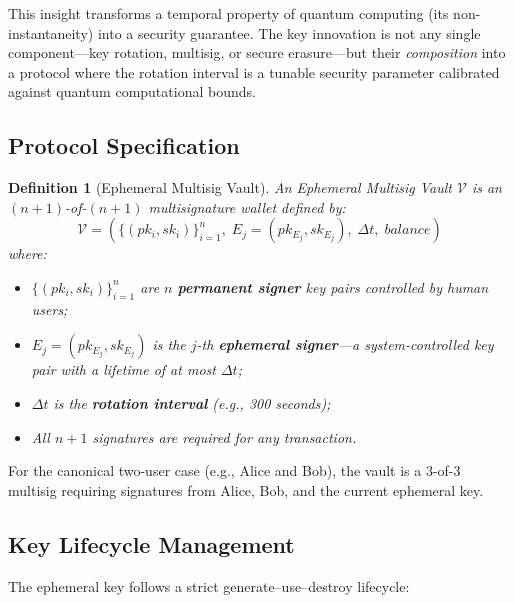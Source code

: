 \documentclass[12pt, a4paper, twocolumn]{article}
\newtheorem{definition}{Definition}
\begin{document}
This insight transforms a temporal property of quantum computing (its non-instantaneity) into a security guarantee. The key innovation is not any single component---key rotation, multisig, or secure erasure---but their \emph{composition} into a protocol where the rotation interval is a tunable security parameter calibrated against quantum computational bounds.

\subsection{Protocol Specification}

\begin{definition}[Ephemeral Multisig Vault]
\label{def:emp_vault}
An Ephemeral Multisig Vault $\mathcal{V}$ is an $(n+1)$-of-$(n+1)$ multisignature wallet defined by:
\[
\mathcal{V} = \left(\{(pk_i, sk_i)\}_{i=1}^{n}, \; E_j = (pk_{E_j}, sk_{E_j}), \; \Delta t, \; \mathit{balance}\right)
\]
where:
\begin{itemize}[noitemsep]
  \item $\{(pk_i, sk_i)\}_{i=1}^{n}$ are $n$ \textbf{permanent signer} key pairs controlled by human users;
  \item $E_j = (pk_{E_j}, sk_{E_j})$ is the $j$-th \textbf{ephemeral signer}---a system-controlled key pair with a lifetime of at most $\Delta t$;
  \item $\Delta t$ is the \textbf{rotation interval} (e.g., 300 seconds);
  \item All $n+1$ signatures are required for any transaction.
\end{itemize}
\end{definition}

For the canonical two-user case (e.g., Alice and Bob), the vault is a 3-of-3 multisig requiring signatures from Alice, Bob, and the current ephemeral key.

\subsection{Key Lifecycle Management}

The ephemeral key follows a strict generate--use--destroy lifecycle:
\end{document}
